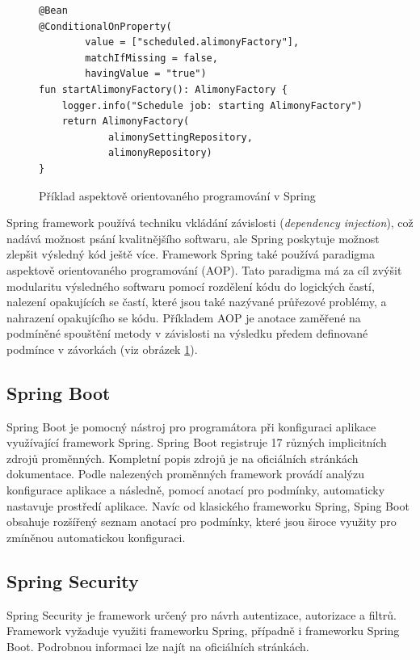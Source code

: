         
        \begin{figure}
            \begin{verbatim}
@Bean
@ConditionalOnProperty(
        value = ["scheduled.alimonyFactory"],
        matchIfMissing = false,
        havingValue = "true")
fun startAlimonyFactory(): AlimonyFactory {
    logger.info("Schedule job: starting AlimonyFactory")
    return AlimonyFactory(
            alimonySettingRepository,
            alimonyRepository)
}
            \end{verbatim}
            \caption{Příklad aspektově orientovaného programování v Spring} 
            \label{code:spring-conditional}
        \end{figure}
        Spring framework používá techniku vkládání závislosti (\textit{dependency injection}), což nadává možnost psání kvalitnějšího softwaru, ale Spring poskytuje možnost zlepšit výsledný kód ještě více. Framework Spring také používá paradigma aspektově orientovaného programování (AOP). Tato paradigma má za cíl zvýšit modularitu výsledného softwaru pomocí rozdělení kódu do logických častí, nalezení opakujících se častí, které jsou také nazývané průřezové problémy, a nahrazení opakujícího se kódu. Příkladem AOP je anotace zaměřené na podmíněné spouštění metody v závislosti na výsledku předem definované podmínce v závorkách (viz obrázek \ref{code:spring-conditional}).
    
    \subsection{Spring Boot}
        Spring Boot je pomocný nástroj pro programátora při konfiguraci aplikace využívající framework Spring. Spring Boot registruje 17 různých implicitních zdrojů proměnných. Kompletní popis zdrojů je na oficiálních stránkách dokumentace\cite{spring-property-sources}. Podle nalezených proměnných framework provádí analýzu konfigurace aplikace a následně, pomocí anotací pro podmínky, automaticky nastavuje prostředí aplikace. Navíc od klasického frameworku Spring, Sping Boot obsahuje rozšířený seznam anotací pro podmínky, které jsou široce využity pro zmíněnou automatickou konfiguraci.\cite{spring-boot}
    
    \subsection{Spring Security}
        Spring Security je framework určený pro návrh autentizace, autorizace a filtrů. Framework vyžaduje využiti frameworku Spring, případně i frameworku Spring Boot. Podrobnou informaci lze najít na oficiálních stránkách\cite{spring-security}.
    
